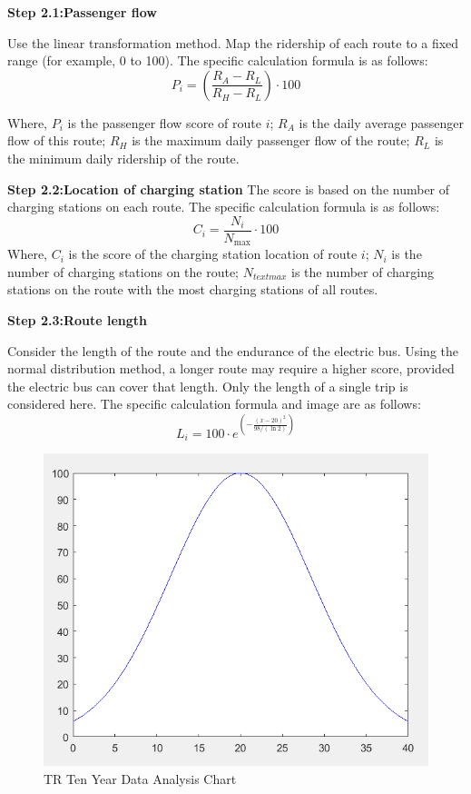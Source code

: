 \documentclass[12pt]{article}
\begin{document}
\textbf{Step 2.1:Passenger flow}

Use the linear transformation method. Map the ridership of each route to a fixed range (for example, 0 to 100). 
The specific calculation formula is as follows:
\begin{equation}
	P_i = \left(\frac{{R_A - R_L}}{{R_H - R_L}}\right) \cdot 100
\end{equation}
 
Where, $P_i$ is the passenger flow score of route $i$; $R_A$ is the daily average passenger flow of this route; $R_H$ is the maximum daily passenger 
 flow of the route; $R_L$ is the minimum daily ridership of the route.

\textbf{Step 2.2:Location of charging station}
The score is based on the number of charging stations on each route. The specific calculation formula is as follows:
\begin{equation}
C_i = \frac{{N_i}}{{N_{\text{max}}}} \cdot 100
\end{equation}
Where, $C_i$ is the score of the charging station location of route $i$; $N_i$ is the number of charging stations on the route; $N_{text{max}}$ is the number of charging 
stations on the route with the most charging stations of all routes.

\textbf{Step 2.3:Route length}

Consider the length of the route and the endurance of the electric bus. Using the normal distribution method, a longer route may require a higher score, 
provided the electric bus can cover that length. Only the length of a single trip is considered here. The specific calculation formula and image are as follows:
\begin{equation}
	L_i = 100 \cdot e^{\left(-\frac{{(x-20)^2}}{{98/(\ln 2)}}\right)}
\end{equation}

\begin{figure}[H]
	\centering
	\includegraphics[scale=0.7]{data analysis.png}%
	\caption{TR Ten Year Data Analysis Chart} %
\end{figure}
\end{document}

